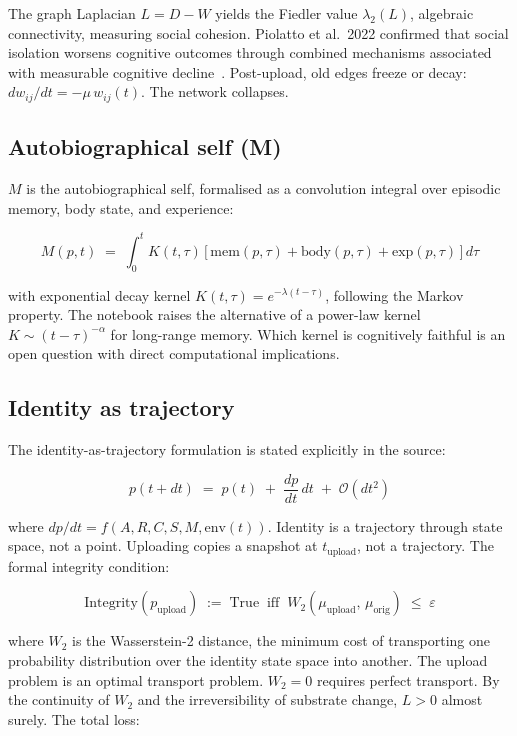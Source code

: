 \documentclass[12pt, a4paper]{article}
\begin{document}
The graph Laplacian $L = D - W$ yields the Fiedler value $\lambda_2(L)$, algebraic connectivity,
measuring social cohesion. Piolatto et al.\ 2022 confirmed that social isolation worsens cognitive
outcomes through combined mechanisms associated with measurable cognitive decline~\cite{Alg-10}.
Post-upload, old edges freeze or decay: $dw_{ij}/dt = -\mu\,w_{ij}(t)$. The network collapses.

\subsection*{Autobiographical self (M)}

$M$ is the autobiographical self, formalised as a convolution integral over episodic memory, body
state, and experience:

\begin{equation}
M(p,t) \;=\; \int_0^t K(t,\tau)\,\bigl[\,\mathrm{mem}(p,\tau)
           + \mathrm{body}(p,\tau) + \mathrm{exp}(p,\tau)\,\bigr]\,d\tau
\end{equation}

with exponential decay kernel $K(t,\tau) = e^{-\lambda(t-\tau)}$, following the Markov property. The
notebook raises the alternative of a power-law kernel $K \sim (t-\tau)^{-\alpha}$ for long-range
memory. Which kernel is cognitively faithful is an open question with direct computational
implications.

\subsection*{Identity as trajectory}

The identity-as-trajectory formulation is stated explicitly in the source:

\begin{equation}
p(t+dt) \;=\; p(t) \;+\; \frac{dp}{dt}\,dt \;+\; \mathcal{O}(dt^2)
\end{equation}

where $dp/dt = f(A, R, C, S, M, \mathrm{env}(t))$. Identity is a trajectory through state space,
not a point. Uploading copies a snapshot at $t_{\mathrm{upload}}$, not a trajectory. The formal
integrity condition:

\begin{equation}
\mathrm{Integrity}(p_{\mathrm{upload}}) \;:=\; \mathrm{True}
\;\;\text{iff}\;\;
W_2(\mu_{\mathrm{upload}},\, \mu_{\mathrm{orig}}) \;\leq\; \varepsilon
\end{equation}

where $W_2$ is the Wasserstein-2 distance, the minimum cost of transporting one probability
distribution over the identity state space into another. The upload problem is an optimal transport
problem. $W_2 = 0$ requires perfect transport. By the continuity of $W_2$ and the irreversibility of
substrate change, $L > 0$ almost surely. The total loss:
\end{document}
